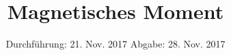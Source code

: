 

\subject{105}
\title{Magnetisches Moment}
\date{%
  Durchführung: 21. Nov. 2017
  \hspace{3em}
  Abgabe: 28. Nov. 2017
}



\maketitle
\thispagestyle{empty}
\tableofcontents
\newpage







\printbibliography{}


